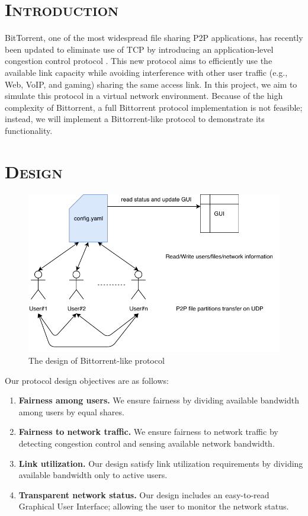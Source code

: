 \section*{\scshape Introduction}
BitTorrent, one of the most widespread file sharing P2P applications, has recently been
updated to eliminate use of TCP by introducing an application-level congestion control
protocol \cite{Arvid}. This new protocol aims to efficiently use the available link capacity while
avoiding interference with other user traffic (e.g., Web, VoIP, and gaming) sharing the
same access link. In this project, we aim to simulate this protocol in a virtual
network environment. Because of the high complexity of Bittorrent, a full Bittorrent protocol implementation is not feasible; instead, we will implement a Bittorrent-like
protocol to demonstrate its functionality. 

\section*{\scshape Design}
\begin{figure}[H]
\centering
   \includegraphics[width=1\linewidth]{design}
   \caption{The design of Bittorrent-like protocol}
   	\label{fig:design}
\end{figure}
Our protocol design objectives are as follows: 
\begin{enumerate}
\item \textbf{Fairness among users.} We ensure fairness by dividing available bandwidth among users by equal shares. 
\item \textbf{Fairness to network traffic.} We ensure fairness to network traffic by detecting congestion control and sensing available network bandwidth. 
\item \textbf{Link utilization.} Our design satisfy link utilization requirements by dividing available bandwidth only to active users. 
\item \textbf{Transparent network status.} Our design includes an easy-to-read Graphical User Interface; allowing the user to monitor the network status. 
\end{enumerate}

